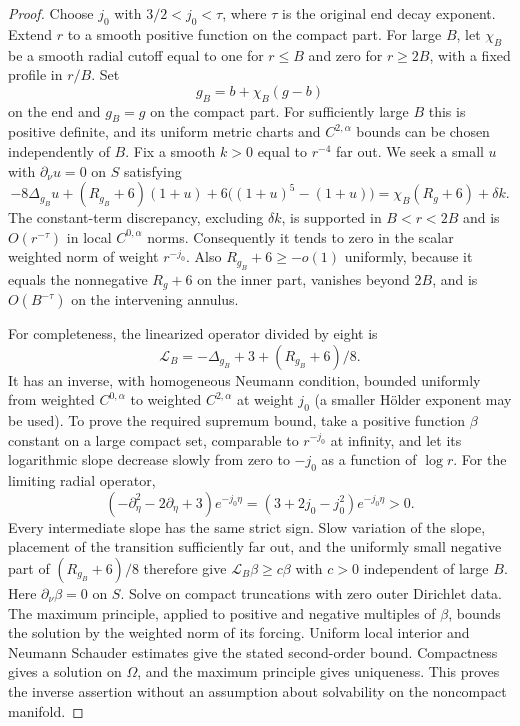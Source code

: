 \begin{proof}
Choose $j_0$ with $3/2<j_0<\tau$, where $\tau$ is the original end
decay exponent.  Extend $r$ to a smooth positive function on the compact
part.  For large $B$, let $\chi_B$ be a smooth radial cutoff equal to one
for $r\le B$ and zero for $r\ge2B$, with a fixed profile in $r/B$.
Set
\[
 g_B=b+\chi_B(g-b)
\]
on the end and $g_B=g$ on the compact part.  For sufficiently large $B$
this is positive definite, and its uniform metric charts and
$C^{2,\alpha}$ bounds can be chosen independently of $B$.  Fix a smooth
$k>0$ equal to $r^{-4}$ far out.  We seek a small $u$ with
$\partial_\nu u=0$ on $S$ satisfying
\begin{equation}
 -8\Delta_{g_B}u+(R_{g_B}+6)(1+u)
 +6\big((1+u)^5-(1+u)\big)
 =\chi_B(R_g+6)+\delta k.
 \label{eq:stress-density-equation}
\end{equation}
The constant-term discrepancy, excluding $\delta k$, is supported in
$B<r<2B$ and is $O(r^{-\tau})$ in local $C^{0,\alpha}$ norms.
Consequently it tends to zero in the scalar weighted norm of weight
$r^{-j_0}$.  Also $R_{g_B}+6\ge-o(1)$ uniformly, because it equals the
nonnegative $R_g+6$ on the inner part, vanishes beyond $2B$, and is
$O(B^{-\tau})$ on the intervening annulus.

For completeness, the linearized operator divided by eight is
\[
 \mathscr L_B=-\Delta_{g_B}+3+(R_{g_B}+6)/8.
\]
It has an inverse, with homogeneous Neumann condition, bounded uniformly
from weighted $C^{0,\alpha}$ to weighted $C^{2,\alpha}$ at weight
$j_0$ (a smaller H\"older exponent may be used).  To prove the required
supremum bound, take a positive function $\beta$ constant on a large
compact set, comparable to $r^{-j_0}$ at infinity, and let its logarithmic
slope decrease slowly from zero to $-j_0$ as a function of $\log r$.
For the limiting radial operator,
\[
 (-\partial_\eta^2-2\partial_\eta+3)e^{-j_0\eta}
 =(3+2j_0-j_0^2)e^{-j_0\eta}>0.
\]
Every intermediate slope has the same strict sign.  Slow variation of
the slope, placement of the transition sufficiently far out, and the
uniformly small negative part of $(R_{g_B}+6)/8$ therefore give
$\mathscr L_B\beta\ge c\beta$ with $c>0$ independent of large $B$.
Here $\partial_\nu\beta=0$ on $S$.  Solve on compact truncations with
zero outer Dirichlet data.  The maximum principle, applied to positive
and negative multiples of $\beta$, bounds the solution by the weighted
norm of its forcing.  Uniform local interior and Neumann Schauder
estimates give the stated second-order bound.  Compactness gives a
solution on $\Omega$, and the maximum principle gives uniqueness.
This proves the inverse assertion without an assumption about solvability
on the noncompact manifold.


\end{proof}

